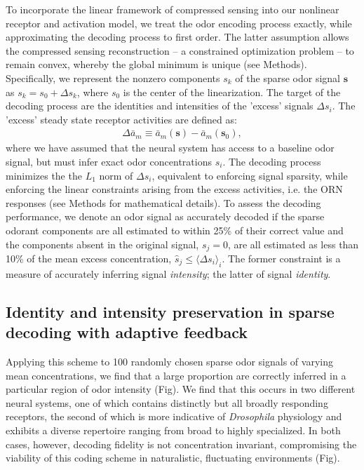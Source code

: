 To incorporate the linear framework of compressed sensing into our nonlinear receptor and activation model, we treat the odor encoding process exactly, while approximating the decoding process to first order. The latter assumption allows the compressed sensing reconstruction -- a constrained optimization problem -- to remain convex, whereby the global minimum is unique (see Methods). Specifically, we represent the nonzero components $s_k$ of the sparse odor signal $\mathbf s$ as $s_k = s_0 + \Delta s_k$, where $s_0$ is the center of the linearization. The target of the decoding process are the identities and intensities of the 'excess' signals $\Delta s_i$. The 'excess' steady state receptor activities are defined as:
\begin{align}
\Delta \bar a_m \equiv \bar a_m(\mathbf s) - \bar a_m(\mathbf s_0),
\end{align}
where we have assumed that the neural system has access to a baseline odor signal, but must infer exact odor concentrations $s_i$. The decoding process minimizes the the $L_1$ norm of $\Delta s_i$, equivalent to enforcing signal sparsity, while enforcing the linear constraints arising from the excess activities, i.e. the ORN responses (see Methods for mathematical details). To assess the decoding performance, we denote an odor signal as accurately decoded if the sparse odorant components are all estimated to within 25\% of their correct value and the components absent in the original signal, $s_j = 0$, are all estimated as less than 10\% of the mean excess concentration, $\hat s_j \le \langle \Delta s_i \rangle_i$. The former constraint is a measure of accurately inferring signal \textit{intensity}; the latter of signal \textit{identity}. 

\subsection{Identity and intensity preservation in sparse decoding with adaptive feedback}

Applying this scheme to 100 randomly chosen sparse odor signals of varying mean concentrations, we find that a large proportion are correctly inferred in a particular region of odor intensity (Fig). We find that this occurs in two different neural systems, one of which contains distinctly but all broadly responding receptors, the second of which is more indicative of \textit{Drosophila} physiology and exhibits a diverse repertoire ranging from broad to highly specialized. In both cases, however, decoding fidelity is not concentration invariant, compromising the viability of this coding scheme in naturalistic, fluctuating environments (Fig). 

